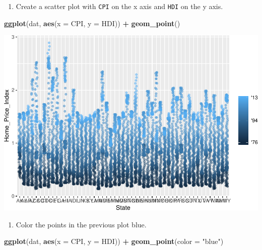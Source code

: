\documentclass[
]{book}
\newenvironment{Shaded}{\begin{snugshade}}{\end{snugshade}}
\newcommand{\DataTypeTok}[1]{\textcolor[rgb]{0.13,0.29,0.53}{#1}}
\newcommand{\KeywordTok}[1]{\textcolor[rgb]{0.13,0.29,0.53}{\textbf{#1}}}
\newcommand{\NormalTok}[1]{#1}
\newcommand{\OperatorTok}[1]{\textcolor[rgb]{0.81,0.36,0.00}{\textbf{#1}}}
\newcommand{\StringTok}[1]{\textcolor[rgb]{0.31,0.60,0.02}{#1}}
\providecommand{\tightlist}{%
  \setlength{\itemsep}{0pt}\setlength{\parskip}{0pt}}
\begin{document}
\begin{alert}

\begin{enumerate}
\def\labelenumi{\arabic{enumi}.}
\tightlist
\item
  Create a scatter plot with \texttt{CPI} on the x axis and \texttt{HDI} on the y axis.
\end{enumerate}

\begin{Shaded}
\begin{Highlighting}[]
\KeywordTok{ggplot}\NormalTok{(dat, }\KeywordTok{aes}\NormalTok{(}\DataTypeTok{x =}\NormalTok{ CPI, }\DataTypeTok{y =}\NormalTok{ HDI)) }\OperatorTok{+}
\StringTok{  }\KeywordTok{geom\_point}\NormalTok{()}
\end{Highlighting}
\end{Shaded}

\includegraphics{R/Rgraphics/figures/unnamed-chunk-171-1.pdf}

\begin{enumerate}
\def\labelenumi{\arabic{enumi}.}
\setcounter{enumi}{1}
\tightlist
\item
  Color the points in the previous plot blue.
\end{enumerate}

\begin{Shaded}
\begin{Highlighting}[]
\KeywordTok{ggplot}\NormalTok{(dat, }\KeywordTok{aes}\NormalTok{(}\DataTypeTok{x =}\NormalTok{ CPI, }\DataTypeTok{y =}\NormalTok{ HDI)) }\OperatorTok{+}
\StringTok{  }\KeywordTok{geom\_point}\NormalTok{(}\DataTypeTok{color =} \StringTok{"blue"}\NormalTok{)}
\end{Highlighting}
\end{Shaded}


\end{alert}
\end{document}
